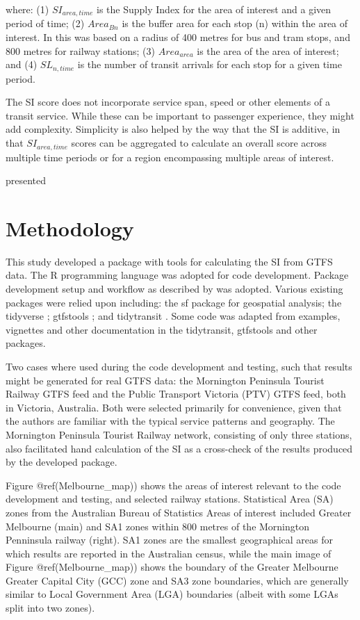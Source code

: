 \documentclass[preprint, 3p,
authoryear]{elsarticle} %
\begin{document}
where: (1) \(SI_{area, time}\) is the Supply Index for the area of
interest and a given period of time; (2) \(Area_{Bn}\) is the buffer
area for each stop (n) within the area of interest. In
\citet{currie2010identifying} this was based on a radius of 400 metres
for bus and tram stops, and 800 metres for railway stations; (3)
\(Area_{area}\) is the area of the area of interest; and (4)
\(SL_{n,time}\) is the number of transit arrivals for each stop for a
given time period.

The SI score does not incorporate service span, speed or other elements
of a transit service. While these can be important to passenger
experience, they might add complexity. Simplicity is also helped by the
way that the SI is additive, in that \(SI_{area, time}\) scores can be
aggregated to calculate an overall score across multiple time periods or
for a region encompassing multiple areas of interest.

\citet{currie2010identifying} presented

\hypertarget{methodology}{%
\section{Methodology}\label{methodology}}

This study developed a package with tools for calculating the SI from
GTFS data. The R programming language \citep{R-base} was adopted for
code development. Package development setup and workflow as described by
\citet{wickham2023r} was adopted. Various existing packages were relied
upon including: the sf package \citep{R-sf} for geospatial analysis; the
tidyverse \citep{tidyverse2019}; gtfstools \citep{R-gtfstools}; and
tidytransit \citep{R-tidytransit}. Some code was adapted from examples,
vignettes and other documentation in the tidytransit, gtfstools and
other packages.

Two cases where used during the code development and testing, such that
results might be generated for real GTFS data: the Mornington Peninsula
Tourist Railway GTFS feed and the Public Transport Victoria (PTV) GTFS
feed, both in Victoria, Australia. Both were selected primarily for
convenience, given that the authors are familiar with the typical
service patterns and geography. The Mornington Peninsula Tourist Railway
network, consisting of only three stations, also facilitated hand
calculation of the SI as a cross-check of the results produced by the
developed package.

Figure @ref(Melbourne\_map)) shows the areas of interest relevant to the
code development and testing, and selected railway stations. Statistical
Area (SA) zones from the Australian Bureau of Statistics \citep{ABSmaps}
Areas of interest included Greater Melbourne (main) and SA1 zones within
800 metres of the Mornington Penninsula railway (right). SA1 zones are
the smallest geographical areas for which results are reported in the
Australian census, while the main image of Figure @ref(Melbourne\_map))
shows the boundary of the Greater Melbourne Greater Capital City (GCC)
zone and SA3 zone boundaries, which are generally similar to Local
Government Area (LGA) boundaries (albeit with some LGAs split into two
zones).
\end{document}
